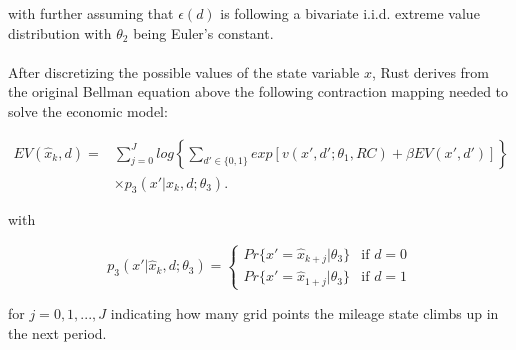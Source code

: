 with further assuming that $\epsilon(d)$ is following a bivariate i.i.d. extreme value distribution with $\theta_2$ being Euler's constant. \paragraph{}

After discretizing the possible values of the state variable $x$, Rust derives from the original Bellman equation above the following contraction mapping needed to solve the economic model:

\begin{equation}
\label{eq7}
	\begin{split}
		EV(\hat x_k, d) = &\sum_{j=0}^{J} log \left\{ \sum_{d'\in\{0, 1\}}  exp[v(x', d'; \theta_1, RC) + \beta EV(x', d')]\right\} \\[+3mm]
		&\times p_3(x'|\hat x_k, d; \theta_3).
	\end{split}
\end{equation}

with

\[p_3(x'|\hat x_k, d; \theta_3) = \left\{
\begin{array}{lr}
	Pr\{x'=\hat x_{k+j}|\theta_3\}  & \mbox{if } d = 0 \\
	Pr\{x'=\hat x_{1+j}|\theta_3\} & \mbox{if } d = 1
\end{array}
\right.
\]

for $j=0, 1, ..., J$ indicating how many grid points the mileage state climbs up in the next period. \paragraph{}

